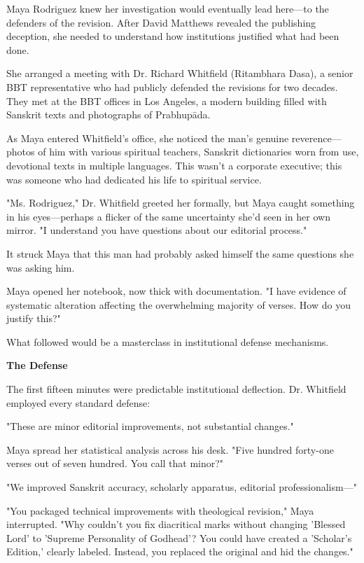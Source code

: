 \documentclass[12pt,twoside]{book}
\begin{document}
\normalfont\justifying
Maya Rodriguez knew her investigation would eventually lead here—to the defenders of the revision. After David Matthews revealed the publishing deception, she needed to understand how institutions justified what had been done.

She arranged a meeting with Dr. Richard Whitfield (Ritambhara Dasa), a senior BBT representative who had publicly defended the revisions for two decades. They met at the BBT offices in Los Angeles, a modern building filled with Sanskrit texts and photographs of Prabhupāda.

As Maya entered Whitfield's office, she noticed the man's genuine reverence—photos of him with various spiritual teachers, Sanskrit dictionaries worn from use, devotional texts in multiple languages. This wasn't a corporate executive; this was someone who had dedicated his life to spiritual service.

"Ms. Rodriguez," Dr. Whitfield greeted her formally, but Maya caught something in his eyes—perhaps a flicker of the same uncertainty she'd seen in her own mirror. "I understand you have questions about our editorial process."

It struck Maya that this man had probably asked himself the same questions she was asking him.

Maya opened her notebook, now thick with documentation. "I have evidence of systematic alteration affecting the overwhelming majority of verses. How do you justify this?"

What followed would be a masterclass in institutional defense mechanisms.


\vspace{0.5cm}
\textbf{The Defense}
\vspace{0.2cm}


The first fifteen minutes were predictable institutional deflection. Dr. Whitfield employed every standard defense:

"These are minor editorial improvements, not substantial changes."

Maya spread her statistical analysis across his desk. "Five hundred forty-one verses out of seven hundred. You call that minor?"

"We improved Sanskrit accuracy, scholarly apparatus, editorial professionalism—"

"You packaged technical improvements with theological revision," Maya interrupted. "Why couldn't you fix diacritical marks without changing 'Blessed Lord' to 'Supreme Personality of Godhead'? You could have created a 'Scholar's Edition,' clearly labeled. Instead, you replaced the original and hid the changes."
\end{document}
